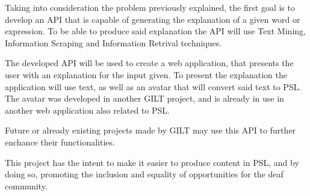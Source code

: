 Taking into consideration the problem previously explained, the first goal is to develop an \gls{API} that is capable of generating the explanation of a given word or expression.
To be able to produce said explanation the \gls{API} will use Text Mining, Information Scraping and Information Retrival techniques.

The developed \gls{API} will be used to create a web application, that presents the user with an explanation for the input given.
To present the explanation the application will use text, as well as an avatar that will convert said text to \gls{PSL}.
The avatar was developed in another GILT project, and is already in use in another web application also related to \gls{PSL}.

Future or already existing projects made by GILT may use this \gls{API} to further enchance their functionalities.

This project has the intent to make it easier to produce content in \gls{PSL}, and by doing so, promoting the inclusion and equality of opportunities for the deaf community. 
